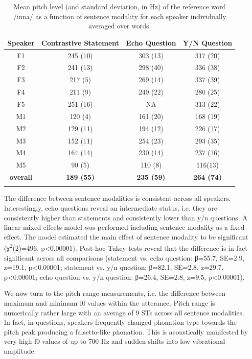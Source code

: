\begin{table}
  \begin{tabular}{cccc}
    \lsptoprule
\textbf{Speaker} & \textbf{Contrastive Statement} & \textbf{Echo Question} &\textbf{ Y/N Question} \\
    \midrule
F1  & 245 (10)  & 303 (13)  & 317 (20)\\
F2  & 241 (13)  & 298 (40)  & 336 (38)\\
F3  & 217 (5)  & 269 (14)  & 337 (39)\\
F4  & 211 (9)  & 249 (22)  & 280 (25)\\
F5  & 251 (16)  & NA  & 313 (22)\\
M1  & 120 (4)  & 161 (20)  & 168 (19)\\
M2  & 129 (11)  & 194 (12)  & 226 (17)\\
M3  & 152 (11)  & 254 (23)  & 293 (35)\\
M4  & 164 (14)  & 230 (14)  & 237 (16)\\
M5  & 90 (5)  & 110 (8)  & 116(13)\\
\midrule
\textbf{overall} & \textbf{189 (55) } & \textbf{235 (59)}  & \textbf{264 (74)}\\
\lspbottomrule
  \end{tabular}
  \caption{Mean pitch level (and standard deviation, in Hz) of the reference word /inna/ as a function of sentence modality for each speaker individually averaged over words.}
  \label{tab:5.2}
\end{table}

The difference between sentence modalities is consistent across all speakers. Interestingly, echo questions reveal an intermediate status, i.e. they are consistently higher than statements and consistently lower than y/n questions. A linear mixed effects model was performed including sentence modality as a fixed effect. The model estimated the main effect of sentence modality to be significant (χ\textsuperscript{2}(2)=496, p<0.00001). Post-hoc Tukey tests reveal that the difference is in fact significant across all comparisons (statement vs. echo question: β=55.7, SE=2.9, z=19.1, p<0.00001; statement vs. y/n question: β=82.1, SE=2.8, z=29.7, p<0.00001; echo question vs. y/n question: β=26.4, SE=2.8, z=9.5, p<0.00001).

We now turn to the pitch range measurements, i.e. the difference between maximum and minimum f0 values within the utterance. Pitch range is numerically rather large with an average of 9 STs across all sentence modalities. In fact, in questions, speakers frequently changed phonation type towards the pitch peak producing a falsetto-like phonation. This is acoustically manifested by very high f0 values of up to 700 Hz and sudden shifts into low vibrational amplitude.


